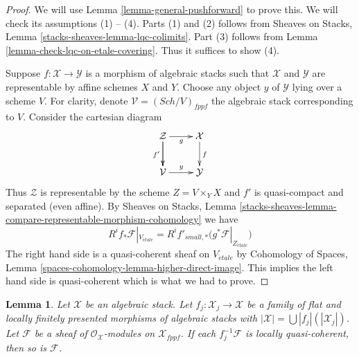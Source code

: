 \documentclass{stacks-project}
\theoremstyle{plain}
\newtheorem{lemma}[subsection]{Lemma}
\theoremstyle{definition}
\theoremstyle{remark}
\numberwithin{equation}{subsection}
\def\Sch{\mathit{Sch}}
\def\etale{{\acute{e}tale}}
\begin{document}
\begin{proof}
We will use
Lemma \ref{lemma-general-pushforward}
to prove this. We will check its assumptions (1) -- (4).
Parts (1) and (2) follows from
Sheaves on Stacks, Lemma \ref{stacks-sheaves-lemma-lqc-colimits}.
Part (3) follows from
Lemma \ref{lemma-check-lqc-on-etale-covering}.
Thus it suffices to show (4).

\medskip\noindent
Suppose $f : \mathcal{X} \to \mathcal{Y}$ is a morphism of algebraic stacks
such that $\mathcal{X}$ and $\mathcal{Y}$ are representable by affine
schemes $X$ and $Y$. Choose any object $y$ of $\mathcal{Y}$ lying over a
scheme $V$. For clarity, denote $\mathcal{V} = (\Sch/V)_{fppf}$ the
algebraic stack corresponding to $V$. Consider the cartesian diagram
$$
\xymatrix{
\mathcal{Z} \ar[d] \ar[r]_g \ar[d]_{f'} & \mathcal{X} \ar[d]^f \\
\mathcal{V} \ar[r]^y & \mathcal{Y}
}
$$
Thus $\mathcal{Z}$ is representable by the scheme $Z = V \times_Y X$
and $f'$ is quasi-compact and separated (even affine). By
Sheaves on Stacks, Lemma
\ref{stacks-sheaves-lemma-compare-representable-morphism-cohomology}
we have
$$
R^if_*\mathcal{F}|_{V_\etale} =
R^if'_{small, *}\big(g^*\mathcal{F}|_{Z_\etale}\big)
$$
The right hand side is a quasi-coherent sheaf on $V_\etale$ by
Cohomology of Spaces, Lemma
\ref{spaces-cohomology-lemma-higher-direct-image}.
This implies the left hand side is quasi-coherent which is what
we had to prove.
\end{proof}

\begin{lemma}
\label{lemma-check-lqc-on-flat-covering}
Let $\mathcal{X}$ be an algebraic stack. Let
$f_j : \mathcal{X}_j \to \mathcal{X}$ be a family of flat
and locally finitely presented morphisms of algebraic stacks with
$|\mathcal{X}| =\bigcup |f_j|(|\mathcal{X}_j|)$.
Let $\mathcal{F}$ be a sheaf of $\mathcal{O}_\mathcal{X}$-modules
on $\mathcal{X}_{fppf}$. If each $f_j^{-1}\mathcal{F}$
is locally quasi-coherent, then so is $\mathcal{F}$.
\end{lemma}
\end{document}
